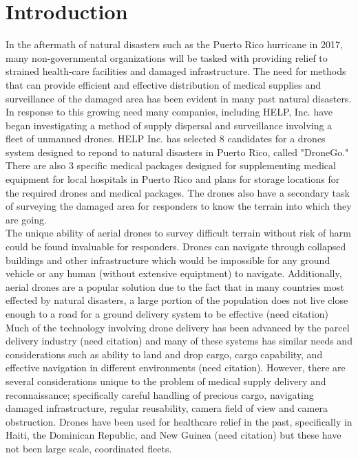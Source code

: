 \documentclass[twocolumn,10pt]{asme2ej}
\begin{document}
\section{Introduction}
In the aftermath of natural disasters such as the Puerto Rico hurricane in 2017, many non-governmental organizations will be tasked with providing relief to strained health-care facilities and damaged infrastructure. The need for methods that can provide efficient and effective distribution of medical supplies and surveillance of the damaged area has been evident in many past natural disasters. In response to this growing need many companies, including HELP, Inc. have began investigating a method of supply dispersal and surveillance involving a fleet of unmanned drones. HELP Inc. has selected 8 candidates for a drones system designed to repond to natural disasters in Puerto Rico, called "DroneGo." There are also 3 specific medical packages designed for supplementing medical equipment for local hospitals in Puerto Rico and plans for storage locations for the required drones and medical packages. The drones also have a secondary task of surveying the damaged area for responders to know the terrain into which they are going. \\
The unique ability of aerial drones to survey difficult terrain without risk of harm could be found invaluable for responders. Drones can navigate through collapsed buildings and other infrastructure which would be impossible for any ground vehicle or any human (without extensive equiptment) to navigate. Additionally, aerial drones are a popular solution due to the fact that in many countries most effected by natural disasters, a large portion of the population does not live close enough to a road for a ground delivery system to be effective (need citation)\\
Much of the technology involving drone delivery has been advanced by the parcel delivery industry (need citation) and many of these systems has similar needs and considerations such as ability to land and drop cargo, cargo capability, and effective navigation in different environments (need citation). However, there are several considerations unique to the problem of medical supply delivery and reconnaissance; specifically careful handling of precious cargo, navigating damaged infrastructure, regular reusability, camera field of view and camera obstruction. Drones have been used for healthcare relief in the past, specifically in Haiti, the Dominican Republic, and New Guinea (need citation) but these have not been large scale, coordinated fleets. \\
\end{document}
